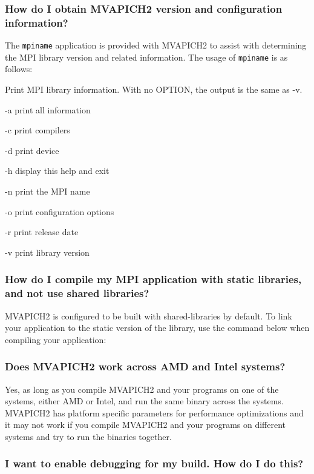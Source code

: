 \subsubsection{How do I obtain MVAPICH2 version and configuration information?}
\label{subsec:version}

The \texttt{mpiname} application is provided with MVAPICH2 to assist with
determining the MPI library
version and related information.  The usage of \texttt{mpiname} is as
follows:


Print MPI library information.  With no OPTION, the output is the same as
-v.

  -a    print all information

  -c    print compilers

  -d    print device

  -h    display this help and exit

  -n    print the MPI name

  -o    print configuration options

  -r    print release date

  -v    print library version

\subsubsection{How do I compile my MPI application with static libraries,
and not use shared libraries?}
\label{subsec:shlib}

MVAPICH2 is configured to be built with shared-libraries by default. To link
your application to the static version of the library, use the command below
when compiling your application:


\subsubsection{Does MVAPICH2 work across AMD and Intel systems?}

Yes, as long as you compile MVAPICH2 and your programs on one of the systems, 
either AMD or Intel, and run the same binary across the systems. 
MVAPICH2 has platform specific parameters for performance 
optimizations and it may not work if you compile MVAPICH2 and your programs
on different systems and try to run the binaries together.

\subsubsection{I want to enable debugging for my build. How do I do
this?}

